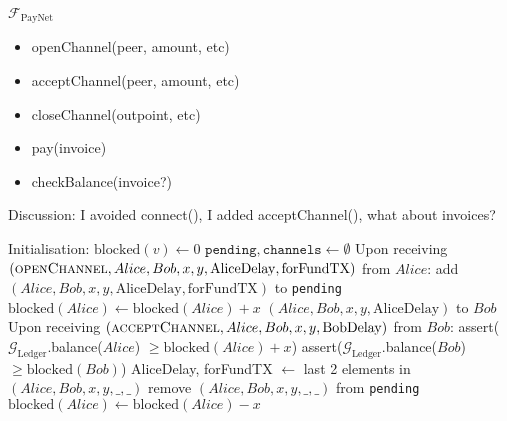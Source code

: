 \begin{functionality}{$\mathcal{F}_{\mathrm{PayNet}}$}
  \label{alg:payfunc}
    \begin{itemize}
      \item openChannel(peer, amount, etc)
      \item acceptChannel(peer, amount, etc)
      \item closeChannel(outpoint, etc)
      \item pay(invoice)
      \item checkBalance(invoice?)
    \end{itemize}
    Discussion: I avoided connect(), I added acceptChannel(), what about
    invoices?
  \begin{algorithmic}[1]
    \State Initialisation:
      \Indent
        \State $\mathrm{blocked}\left(v\right) \gets 0$
      \EndFor
      \State $\mathtt{pending}, \mathtt{channels} \gets \emptyset$
      \EndIndent
    \State
    \State Upon receiving $\left(\textsc{openChannel}, Alice, Bob, x, y,
    \mathrm{AliceDelay}, \mathrm{forFundTX}\right)$ from $Alice$:
    \Indent
        \State add $\left(Alice, Bob, x, y, \mathrm{AliceDelay},
        \mathrm{forFundTX}\right)$ to \texttt{pending}
        \State $\mathrm{blocked}\left(Alice\right) \leftarrow
        \mathrm{blocked}\left(Alice\right) + x$
        \State \Return $\left(Alice, Bob, x, y, \mathrm{AliceDelay}\right)$ to
        $Bob$ 
      \EndIf
    \EndIndent
    \State
    \State Upon receiving $\left(\textsc{acceptChannel}, Alice, Bob, x, y,
    \mathrm{BobDelay}\right)$ from $Bob$: 
    \Indent
        \State assert($\mathcal{G}_{\mathrm{Ledger}}$.balance($Alice$) $\geq
        \mathrm{blocked}\left(Alice\right) + x$)
        \State assert($\mathcal{G}_{\mathrm{Ledger}}$.balance($Bob$) $\geq
        \mathrm{blocked}\left(Bob\right)$) 
        \State AliceDelay, forFundTX $\gets$ last 2 elements in $\left(Alice,
        Bob, x, y, \_, \_\right)$
        \State remove $\left(Alice, Bob, x, y, \_, \_\right)$ from
        \texttt{pending}
        \State $\mathrm{blocked}\left(Alice\right) \gets
        \mathrm{blocked}\left(Alice\right) - x$

\end{algorithmic}
\end{functionality}
